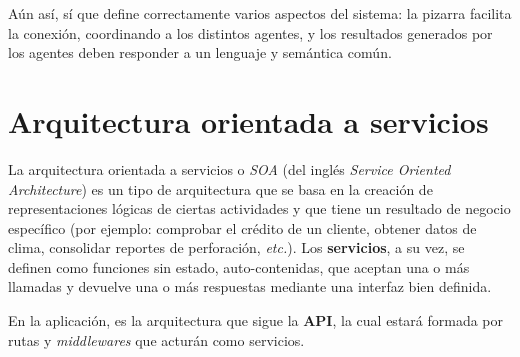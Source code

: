 Aún así, sí que define correctamente varios aspectos del sistema: la pizarra facilita la conexión, coordinando a los distintos agentes, y los resultados generados por los agentes deben responder a un lenguaje y semántica común.\n


\section{Arquitectura orientada a servicios} \label{sec:servicearch}

La arquitectura orientada a servicios \cite{wikiSOA} o \textit{SOA} (del inglés \textit{Service Oriented Architecture}) es un tipo de arquitectura que se basa en la creación de representaciones lógicas de ciertas actividades y que tiene un resultado de negocio específico (por ejemplo: comprobar el crédito de un cliente, obtener datos de clima, consolidar reportes de perforación, \textit{etc.}). Los \textbf{servicios}, a su vez, se definen como funciones sin estado, auto-contenidas, que aceptan una o más llamadas y devuelve una o más respuestas mediante una interfaz bien definida.\sn

En la aplicación, es la arquitectura que sigue la \textbf{API}, la cual estará formada por rutas y \textit{middlewares} que acturán como servicios.\sn

